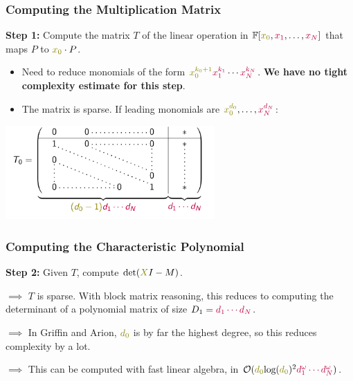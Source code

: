 \documentclass[aspectratio=169]{beamer}
\begin{document}
\begin{frame}
  \frametitle{Computing the Multiplication Matrix}

  \textbf{Step 1:} Compute the matrix $T$ of the linear operation in $\mathbb{F}[\textcolor{olive}{x_0},\textcolor{purple}{x_1},\ldots,\textcolor{purple}{x_N}]$ that maps $P$ to $\textcolor{olive}{x_0} \cdot P$.

  \begin{itemize}
  \item Need to reduce monomials of the form $\textcolor{olive}{x_0^{k_0+1}}\textcolor{purple}{x_1^{k_1}}\cdots \textcolor{purple}{x_N^{k_N}}$. \textbf{We have no tight complexity estimate for this step}.

    \pause
  \item The matrix is sparse. If leading monomials are $\textcolor{olive}{x_0^{d_0}},\ldots,\textcolor{purple}{x_N^{d_N}}$:
  \end{itemize}
  \begin{center}
    \includegraphics[width=8cm]{./figures/matrix}
  \end{center}

  
\end{frame}

\begin{frame}
  \frametitle{Computing the Characteristic Polynomial}
  \textbf{Step 2:} Given $T$, compute $\text{det}(\textcolor{olive}{X}I - M)$.

  $\implies$ $T$ is sparse. With block matrix reasoning, this reduces to computing the determinant of a polynomial matrix of size $D_1 = \textcolor{purple}{d_1\cdots d_N}$.

  $\implies$ In Griffin and Arion, $\textcolor{olive}{d_0}$ is by far the highest degree, so this reduces complexity by a lot.

  $\implies$ This can be computed with fast linear algebra, in $\mathcal{O}(\textcolor{olive}{d_0}\text{log}(\textcolor{olive}{d_0})^2\textcolor{purple}{d_1^\omega\cdots d_N^\omega})$.

  
\end{frame}
\end{document}
